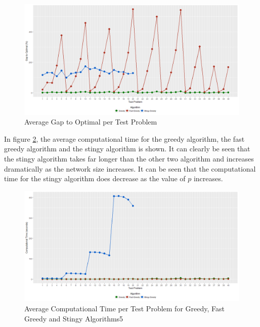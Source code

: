 \documentclass[11pt]{article}
\begin{document}
	\begin{figure}[H]
		\begin{center}
			\includegraphics[width=14cm]{CHavacc.png}
			\caption{Average Gap to Optimal per Test Problem}
			\label{CH.av.acc}
		\end{center}
	\end{figure}

	In figure \ref{CH.av.time}, the average computational time for the greedy algorithm, the fast greedy algorithm and the stingy algorithm is shown.  It can clearly be seen that the stingy algorithm takes far longer than the other two algorithm and increases dramatically as the network size increases.  It can be seen that the computational time for the stingy algorithm does decrease as the value of $p$ increases.
	
	\begin{figure}[H]
		\begin{center}
			\includegraphics[width=14cm]{CHavtime1.png}
			\caption{Average Computational Time per Test Problem for Greedy, Fast Greedy and Stingy Algorithms5}
			\label{CH.av.time}
		\end{center}
	\end{figure}
	
\end{document}
